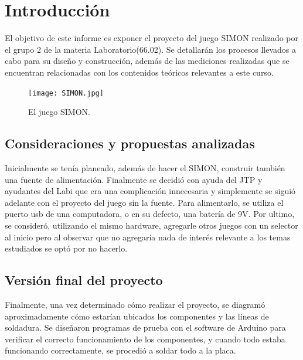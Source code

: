 \documentclass[titlepage,a4paper]{article}
\begin{document}
\newpage

\section{Introducción}\label{sec:intro}
    El objetivo de este informe es exponer el proyecto del juego SIMON realizado por el grupo 2 de la materia Laboratorio(66.02). Se detallarán los procesos llevados a cabo para su diseño y construcción, además de las mediciones realizadas que se encuentran relacionadas con los contenidos teóricos relevantes a este curso.
    
    \begin{figure}[H]
    \centering
    \texttt{[image: SIMON.jpg]}
    \caption{\label{fig:class01}El juego SIMON.}
    \end{figure}

    \subsection{Consideraciones y propuestas analizadas}
        Inicialmente se tenía planeado, además de hacer el SIMON, construir también una fuente de alimentación. Finalmente se decidió con ayuda del JTP y ayudantes del Labi que era una complicación innecesaria y simplemente se siguió adelante con el proyecto del juego sin la fuente. Para alimentarlo, se utiliza el puerto usb de una computadora, o en su defecto, una batería de 9V.
        Por ultimo, se consideró, utilizando el mismo hardware, agregarle otros juegos con un selector al inicio pero al observar que no agregaría nada de interés relevante a los temas estudiados se optó por no hacerlo.
    
    \subsection{Versión final del proyecto}
    Finalmente, una vez determinado cómo realizar el proyecto, se diagramó aproximadamente cómo estarían ubicados los componentes y las líneas de soldadura. Se diseñaron programas de prueba con el software de Arduino para verificar el correcto funcionamiento de los componentes, y cuando todo estaba funcionando correctamente, se procedió a soldar todo a la placa.
    
        
    
\end{document}
